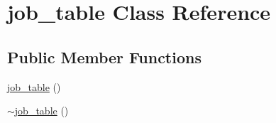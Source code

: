 \hypertarget{classjob__table}{}\section{job\+\_\+table Class Reference}
\label{classjob__table}
\subsection*{Public Member Functions}
\begin{DoxyCompactItemize}
\item 
\mbox{\hyperlink{classjob__table_a8204dcc37ee96ff7f1525b52ac5949ef}{job\+\_\+table}} ()
\item 
\mbox{\hyperlink{classjob__table_ab4cddff4c8373752437bc69f7bab89a0}{$\sim$job\+\_\+table}} ()
\end{DoxyCompactItemize}
